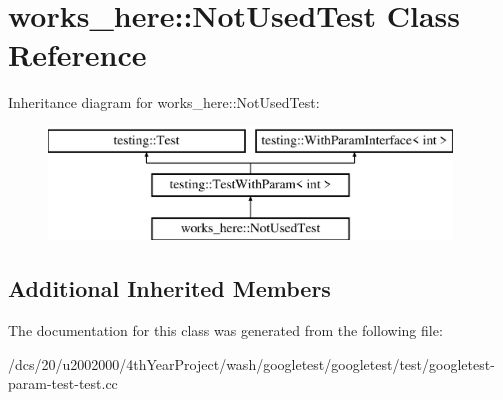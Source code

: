 \hypertarget{classworks__here_1_1NotUsedTest}{}\section{works\+\_\+here\+:\+:Not\+Used\+Test Class Reference}
\label{classworks__here_1_1NotUsedTest}
Inheritance diagram for works\+\_\+here\+:\+:Not\+Used\+Test\+:\begin{figure}[H]
\begin{center}
\leavevmode
\includegraphics[height=3.000000cm]{classworks__here_1_1NotUsedTest}
\end{center}
\end{figure}
\subsection*{Additional Inherited Members}


The documentation for this class was generated from the following file\+:\begin{DoxyCompactItemize}
\item 
/dcs/20/u2002000/4th\+Year\+Project/wash/googletest/googletest/test/googletest-\/param-\/test-\/test.\+cc\end{DoxyCompactItemize}

